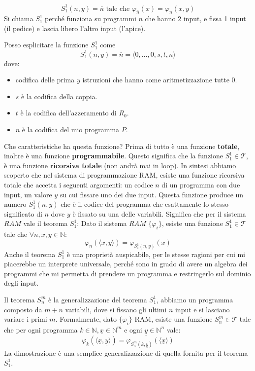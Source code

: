 \documentclass{article}
\begin{document}
\begin{enumerate}
          $$S_1^1(n,y)=\overline{n}\text{ tale che }\varphi_{\overline{n}}(x)=\varphi_n(x,y)$$
          Si chiama $S^1_1$ perché funziona su programmi $n$ che hanno 2 input, e fissa 1 input (il
          pedice) e lascia libero l'altro input (l'apice).

          Posso esplicitare la funzione $S_1^1$ come
          $$S_1^1(n,y)=\overline{n}=\langle 0,\dots,0,s,t,n\rangle$$
          dove:
          \begin{itemize}
              \item codifica delle prima $y$ istruzioni che hanno come aritmetizzazione tutte 0.
              \item $s$ è la codifica della coppia.
              \item $t$ è la codifica dell'azzeramento di $R_0$.
              \item $n$ è la codifica del mio programma $P$.
          \end{itemize}
          Che caratteristiche ha questa funzione? Prima di tutto è una funzione \textbf{totale}, inoltre
          è una funzione \textbf{programmabile}. Questo significa che la funzione $S_1^1\in\mathcal{T}$,
          è una funzione \textbf{ricorsiva totale} (non andrà mai in loop). In sintesi
          abbiamo scoperto che nel sistema di programmazione RAM, esiste una funzione ricorsiva totale che
          accetta i seguenti argomenti: un codice $n$ di un programma con due input, un valore $y$ su cui
          fissare uno dei due input. Questa funzione produce un numero $S_1^1(n,y)$ che è il codice del
          programma che esattamente lo stesso significato di $n$ dove $y$ è fissato su una delle variabili.
          Significa che per il sistema $RAM$ vale il teorema $S_1^1$: Dato il sistema $RAM$ $\{\varphi_i\}$,
          esiste una funzione $S_1^1\in\mathcal{T}$ tale che $\forall n,x,y\in\mathbb{N}$:
          $$\varphi_n\left(\langle x,y\rangle\right)=\varphi_{S_1^1(n,y)}(x)$$
          Anche il teorema $S_1^1$ è una proprietà auspicabile, per le stesse ragioni per cui mi piacerebbe
          un interprete universale, perché sono in grado di avere un algebra dei programmi che mi permetta di
          prendere un programma e restringerlo sul dominio degli input.

          Il teorema $S_n^m$ è la generalizzazione del teorema $S_1^1$, abbiamo un programma composto da
          $m+n$ variabili, dove si fissano gli ultimi $n$ input e si lasciano variare i primi $m$.
          Formalmente, dato $\{\varphi_i\}$ RAM, esiste una funzione $S_n^m\in\mathcal{T}$ tale che per
          ogni programma $k\in\mathbb{N},\underline{x}\in\mathbb{N}^m$ e ogni $\underline{y}\in\mathbb{N}^n$ vale:
          $$\varphi_k\left(\langle\underline{x},\underline{y}\rangle\right)=\varphi_{S_n^m(k,\underline{y})}\left(\langle\underline{x}\rangle\right)$$
          La dimostrazione è una semplice generalizzazione di quella fornita per il teorema $S_1^1$.
\end{enumerate}
\end{document}
